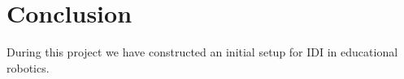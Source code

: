 \section{Conclusion}
During this project we have constructed an initial setup for IDI in educational robotics. 